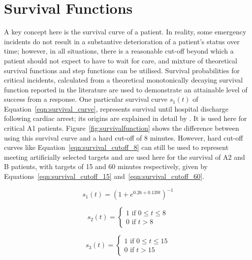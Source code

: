 \documentclass[preprint,12pt]{elsarticle}
\begin{document}
\section{Survival Functions}\label{sec:survival}
A key concept here is the survival curve of a patient.
In reality, some emergency incidents do not result in a substantive deterioration of a patient’s status over time; however, in all situations, there is a reasonable cut-off beyond which a patient should not expect to have to wait for care, and mixture of theoretical survival functions and step functions can be utilised.
Survival probabilities for critical incidents, calculated from a theoretical monotonically decaying survival function reported in the literature \cite{Valenzuela20001206} are used to demonstrate an attainable level of success from a response. One particular survival curve $s_1(t)$ of Equation~\ref{eqn:survival_curve}, represents survival until hospital discharge following cardiac arrest; its origins are explained in detail by \cite{Knight2012918}. It is used here for critical A1 patients. Figure~\ref{fig:survivalfunction} shows the difference between using this survival curve and a hard cut-off of 8 minutes.
However, hard cut-off curves like Equation~\ref{eqn:survival_cutoff_8} can still be used to represent meeting artificially selected targets and are used here for the survival of A2 and B patients, with targets of 15 and 60 minutes respectively, given by Equations~\ref{eqn:survival_cutoff_15} and~\ref{eqn:survival_cutoff_60}.

\begin{equation}\label{eqn:survival_curve}
    s_1(t) = \left(1 + e^{0.26+0.139t}\right)^{-1}
\end{equation}

\begin{equation}\label{eqn:survival_cutoff_8}
    s_2(t) = \begin{cases} 
    1 \text{ if } 0\leq t \leq 8 \\
    0 \text{ if } t > 8 
    \end{cases}
\end{equation}

\begin{equation}\label{eqn:survival_cutoff_15}
    s_3(t) = \begin{cases} 
    1 \text{ if } 0\leq t \leq 15 \\
    0 \text{ if } t > 15 
    \end{cases}
\end{equation}
\end{document}
